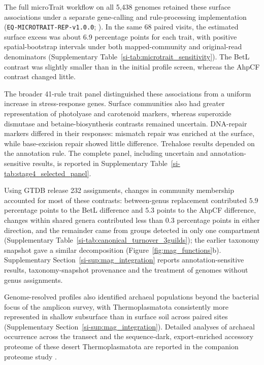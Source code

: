 The full microTrait workflow on all 5,438 genomes retained these surface associations under a separate gene-calling and rule-processing implementation (\texttt{EQ-MICROTRAIT-\allowbreak REP-\allowbreak v1.0.0}; \cite{rubalkhali_datapaper}). In the same 68 paired visits, the estimated surface excess was about 6.9 percentage points for each trait, with positive spatial-bootstrap intervals under both mapped-community and original-read denominators (Supplementary Table~\ref{si-tab:microtrait_sensitivity}). The BetL contrast was slightly smaller than in the initial profile screen, whereas the AhpCF contrast changed little.

The broader 41-rule trait panel distinguished these associations from a uniform increase in stress-response genes. Surface communities also had greater representation of photolyase and carotenoid markers, whereas superoxide dismutase and betaine-biosynthesis contrasts remained uncertain. DNA-repair markers differed in their responses: mismatch repair was enriched at the surface, while base-excision repair showed little difference. Trehalose results depended on the annotation rule. The complete panel, including uncertain and annotation-sensitive results, is reported in Supplementary Table~\ref{si-tab:stage4_selected_panel}.

Using GTDB release 232 assignments, changes in community membership accounted for most of these contrasts: between-genus replacement contributed $5.9$ percentage points to the BetL difference and $5.3$ points to the AhpCF difference, changes within shared genera contributed less than $0.3$ percentage points in either direction, and the remainder came from groups detected in only one compartment (Supplementary Table~\ref{si-tab:canonical_turnover_3guilds}); the earlier taxonomy snapshot gave a similar decomposition (Figure~\ref{fig:mag_functions}b). Supplementary Section~\ref{si-sup:mag_integration} reports annotation-sensitive results, taxonomy-snapshot provenance and the treatment of genomes without genus assignments.

Genome-resolved profiles also identified archaeal populations beyond the bacterial focus of the amplicon survey, with Thermoplasmatota consistently more represented in shallow subsurface than in surface soil across paired sites (Supplementary Section~\ref{si-sup:mag_integration}). Detailed analyses of archaeal occurrence across the transect and the sequence-dark, export-enriched accessory proteome of these desert Thermoplasmatota are reported in the companion proteome study \cite{proteome_companion}.


